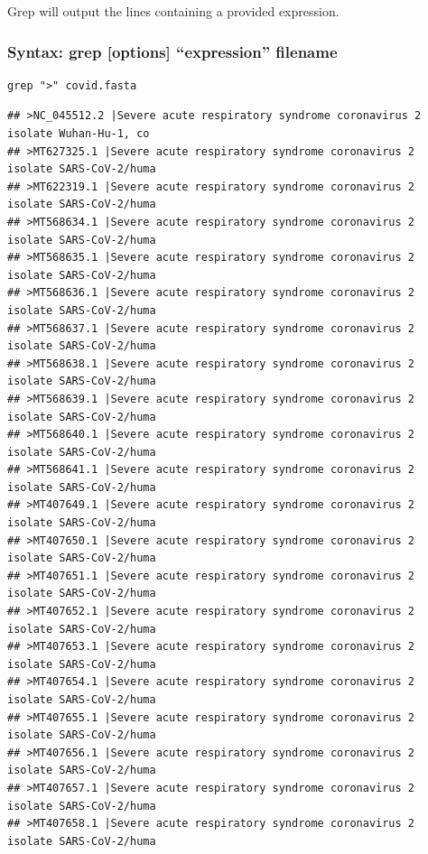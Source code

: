 \documentclass[
]{book}
\begin{document}
Grep will output the lines containing a provided expression.

\hypertarget{syntax-grep-options-expression-filename}{%
\subsubsection*{Syntax: grep {[}options{]} ``expression'' filename}\label{syntax-grep-options-expression-filename}}

\begin{verbatim}
grep ">" covid.fasta
\end{verbatim}

\begin{verbatim}
## >NC_045512.2 |Severe acute respiratory syndrome coronavirus 2 isolate Wuhan-Hu-1, co
## >MT627325.1 |Severe acute respiratory syndrome coronavirus 2 isolate SARS-CoV-2/huma
## >MT622319.1 |Severe acute respiratory syndrome coronavirus 2 isolate SARS-CoV-2/huma
## >MT568634.1 |Severe acute respiratory syndrome coronavirus 2 isolate SARS-CoV-2/huma
## >MT568635.1 |Severe acute respiratory syndrome coronavirus 2 isolate SARS-CoV-2/huma
## >MT568636.1 |Severe acute respiratory syndrome coronavirus 2 isolate SARS-CoV-2/huma
## >MT568637.1 |Severe acute respiratory syndrome coronavirus 2 isolate SARS-CoV-2/huma
## >MT568638.1 |Severe acute respiratory syndrome coronavirus 2 isolate SARS-CoV-2/huma
## >MT568639.1 |Severe acute respiratory syndrome coronavirus 2 isolate SARS-CoV-2/huma
## >MT568640.1 |Severe acute respiratory syndrome coronavirus 2 isolate SARS-CoV-2/huma
## >MT568641.1 |Severe acute respiratory syndrome coronavirus 2 isolate SARS-CoV-2/huma
## >MT407649.1 |Severe acute respiratory syndrome coronavirus 2 isolate SARS-CoV-2/huma
## >MT407650.1 |Severe acute respiratory syndrome coronavirus 2 isolate SARS-CoV-2/huma
## >MT407651.1 |Severe acute respiratory syndrome coronavirus 2 isolate SARS-CoV-2/huma
## >MT407652.1 |Severe acute respiratory syndrome coronavirus 2 isolate SARS-CoV-2/huma
## >MT407653.1 |Severe acute respiratory syndrome coronavirus 2 isolate SARS-CoV-2/huma
## >MT407654.1 |Severe acute respiratory syndrome coronavirus 2 isolate SARS-CoV-2/huma
## >MT407655.1 |Severe acute respiratory syndrome coronavirus 2 isolate SARS-CoV-2/huma
## >MT407656.1 |Severe acute respiratory syndrome coronavirus 2 isolate SARS-CoV-2/huma
## >MT407657.1 |Severe acute respiratory syndrome coronavirus 2 isolate SARS-CoV-2/huma
## >MT407658.1 |Severe acute respiratory syndrome coronavirus 2 isolate SARS-CoV-2/huma

\end{verbatim}
\end{document}
